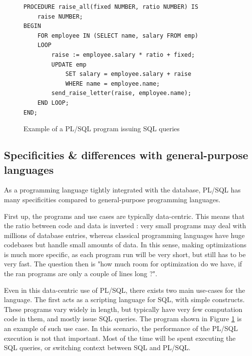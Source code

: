 \documentclass[twoside,11pt,a4paper]{article}
\newcommand{\todo}[1]{\textit{TODO: #1}}
\begin{document}

\begin{figure}[t]
	\begin{lstlisting}[style=PLSQL]
PROCEDURE raise_all(fixed NUMBER, ratio NUMBER) IS
	raise NUMBER;
BEGIN
	FOR employee IN (SELECT name, salary FROM emp)
	LOOP
		raise := employee.salary * ratio + fixed;
		UPDATE emp
			SET salary = employee.salary + raise
			WHERE name = employee.name;
		send_raise_letter(raise, employee.name);
	END LOOP;
END;
	\end{lstlisting}
	
	\caption{Example of a PL/SQL program issuing SQL queries}
	\label{fig:plsraiseall}
\end{figure}


\subsection{Specificities \& differences with general-purpose languages}

As a programming language tightly integrated with the database, PL/SQL has many specificities compared to general-purpose programming languages.

First up, the programs and use cases are typically data-centric. This means that the ratio between code and data is inverted : very small programs may deal with millions of database entries, whereas classical programming languages have huge codebases but handle small amounts of data. In this sense, making optimizations is much more specific, as each program run will be very short, but still has to be very fast. The question then is "how much room for optimization do we have, if the ran programs are only a couple of lines long ?".

Even in this data-centric use of PL/SQL, there exists two main use-cases for the language. The first acts as a scripting language for SQL, with simple constructs. These programs vary widely in length, but typically have very few computation code in them, and mostly issue SQL queries. The program shown in Figure \ref{fig:plsraiseall} is an example of such use case. In this scenario, the performance of the PL/SQL execution is not that important. Most of the time will be spent executing the SQL queries, or switching context between SQL and PL/SQL.
\end{document}
